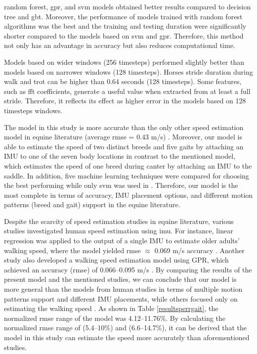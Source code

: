 random forest, \gls{gpr}, and \gls{svm} models obtained better results compared to decision tree and \gls{gbt}. Moreover, the performance of models trained with random forest algorithms was the best and the training and testing duration were significantly shorter compared to the models based on \gls{svm} and \gls{gpr}. Therefore, this method not only has an advantage in accuracy but also reduces computational time.

Models based on wider windows (256 timesteps) performed slightly better than models based on narrower windows (128 timesteps). Horses stride duration during walk and trot can be higher than 0.64 seconds (128 timesteps). Some features, such as \gls{fft} coefficients, generate a useful value when extracted from at least a full stride. Therefore, it reflects its effect as higher error in the models based on 128 timesteps windows.
 
The model in this study is more accurate than the only other speed estimation model in equine literature (average \gls{rmse} = 0.43 m/s) \cite{Schmutz2020}. Moreover, our model is able to estimate the speed of two distinct breeds and five gaits by attaching an IMU to one of the seven body locations in contrast to the mentioned model, which estimates the speed of one breed during canter by attaching an IMU to the saddle. In addition, five machine learning techniques were compared for choosing the best performing while only \gls{svm} was used in \cite{Schmutz2020}. Therefore, our model is the most complete in terms of accuracy, IMU placement options, and different motion patterns (breed and gait) support in the equine literature.

Despite the scarcity of speed estimation studies in equine literature, various studies investigated human speed estimation using \gls{imu}. For instance, linear regression was applied to the output of a single IMU to estimate older adults' walking speed, where the model yielded \gls{rmse} $\approx$ 0.069 m/s accuracy \cite{Byun2019}. Another study also developed a walking speed estimation model using GPR, which achieved an accuracy (\gls{rmse}) of 0.066--0.095 m/s \cite{Zihajehzadeh2016}. By comparing the results of the present model and the mentioned studies, we can conclude that our model is more general than the models from human studies in terms of multiple motion patterns support and different IMU placements, while others focused only on estimating the walking speed \cite{Diez2018}. As shown in Table \ref{resultsperrgait}, the normalized \gls{rmse} range of the model was 4.12--11.76\%. By calculating the normalized \gls{rmse} range of \cite{Zihajehzadeh2016} (5.4--10\%) and \cite{Byun2019} (6.6--14.7\%), it can be derived that the model in this study can estimate the speed more accurately than aforementioned studies.

